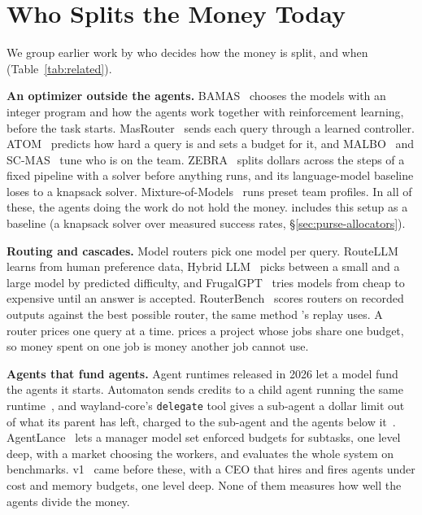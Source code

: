 \section{Who Splits the Money Today}
\label{sec:related}

We group earlier work by who decides how the money is split, and when (Table~\ref{tab:related}).

\textbf{An optimizer outside the agents.} BAMAS~\cite{yang2026bamas} chooses the models with an integer program and how
the agents work together with reinforcement learning, before the task starts. MasRouter~\cite{yue2025masrouter} sends
each query through a learned controller. ATOM~\cite{zhao2026atom} predicts how hard a query is and sets a budget for
it, and MALBO~\cite{sabbatella2025malbo} and SC-MAS~\cite{zhao2026scmas} tune who is on the team.
ZEBRA~\cite{hamri2026zebra} splits dollars across the steps of a fixed pipeline with a solver before anything runs, and
its language-model baseline loses to a knapsack solver. Mixture-of-Models~\cite{pecerskis2026mixtureofmodels} runs
preset team profiles. In all of these, the agents doing the work do not hold the money. \bench{} includes this setup as
a baseline (a knapsack solver over measured success rates, \S\ref{sec:purse-allocators}).

\textbf{Routing and cascades.} Model routers pick one model per query. RouteLLM~\cite{ong2025routellm} learns from
human preference data, Hybrid LLM~\cite{ding2024hybrid} picks between a small and a large model by predicted
difficulty, and FrugalGPT~\cite{chen2024frugalgpt} tries models from cheap to expensive until an answer is accepted.
RouterBench~\cite{hu2024routerbench} scores routers on recorded outputs against the best possible router, the same
method \bench{}'s replay uses. A router prices one query at a time. \bench{} prices a project whose jobs share one
budget, so money spent on one job is money another job cannot use.

\textbf{Agents that fund agents.} Agent runtimes released in 2026 let a model fund the agents it starts. Automaton sends
credits to a child agent running the same runtime~\cite{conway2026automaton}, and wayland-core's \texttt{delegate}
tool gives a sub-agent a dollar limit out of what its parent has left, charged to the sub-agent and the agents below
it~\cite{ferrox2026waylandcore}. AgentLance~\cite{liu2026markets} lets a manager model set enforced budgets for
subtasks, one level deep, with a market choosing the workers, and evaluates the whole system on benchmarks. \sys{}
v1~\cite{pai2025hashiru} came before these, with a CEO that hires and fires agents under cost and memory budgets, one
level deep. None of them measures how well the agents divide the money.

